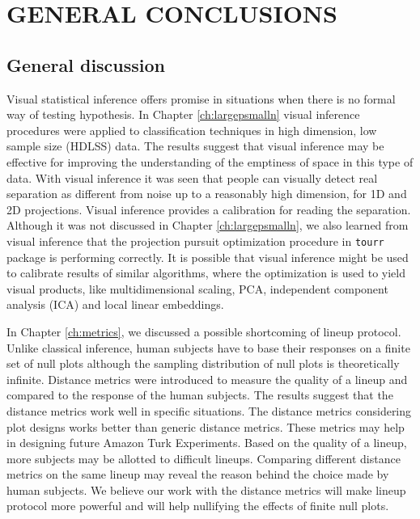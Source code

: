 
\chapter{GENERAL CONCLUSIONS}\label{ch:conclusion}

\section{General discussion} 

Visual statistical inference offers promise in situations when there is no formal way of testing hypothesis. In Chapter \ref{ch:largepsmalln} visual inference procedures were applied to classification techniques in high dimension, low sample size (HDLSS) data. The results suggest that visual inference may be effective for improving the understanding of the emptiness of space in this type of data. With visual inference it was seen that people can visually detect real separation as different from noise up to a reasonably high dimension, for 1D and 2D projections. Visual inference provides a calibration for reading the separation. Although it was not discussed in Chapter \ref{ch:largepsmalln}, we also learned from visual inference that the projection pursuit optimization procedure in \texttt{tourr} package is performing correctly. It is possible that visual inference might be used to calibrate results of similar algorithms, where the optimization is used to yield visual products, like multidimensional scaling, PCA, independent component analysis (ICA) and local linear embeddings. 

In Chapter \ref{ch:metrics}, we discussed a possible shortcoming of lineup protocol. Unlike classical inference, human subjects have to base their responses on a finite set of null plots although the sampling distribution of null plots is theoretically infinite. Distance metrics were introduced to measure the quality of a lineup and compared to the response of the human subjects. The results suggest that the distance metrics work well in specific situations. The distance metrics considering plot designs works better than generic distance metrics. These metrics may help in designing future Amazon Turk Experiments. Based on the quality of a lineup, more subjects may be allotted to difficult lineups. Comparing different distance metrics on the same lineup may reveal the reason behind the choice made by human subjects. We believe our work with the distance metrics will make lineup protocol more powerful and will help nullifying the effects of finite null plots. 

